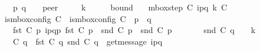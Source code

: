 \begin{isabellebody}
\ \ \ \ \ p\ q\ \ \ {\isacharcolon}{\kern0pt}{\isacharcolon}{\kern0pt}\ {\isachardoublequoteopen}{\isacharprime}{\kern0pt}peer{\isachardoublequoteclose}\isanewline
\ \ \ \ \ k\ \ \ \ \ {\isacharcolon}{\kern0pt}{\isacharcolon}{\kern0pt}\ {\isachardoublequoteopen}bound{\isachardoublequoteclose}\isanewline
\ \ \ {\isachardoublequoteopen}mbox{\isacharunderscore}{\kern0pt}step\ C{}\ {\isacharparenleft}{\kern0pt}{\isacharbang}{\kern0pt}{\isasymlangle}{\isacharparenleft}{\kern0pt}i\isactrlbsup p{\isasymrightarrow}q\isactrlesup {\isacharparenright}{\kern0pt}{\isasymrangle}{\isacharparenright}{\kern0pt}\ k\ C{}{\isachardoublequoteclose}\isanewline
\ \ \ {\isachardoublequoteopen}is{\isacharunderscore}{\kern0pt}mbox{\isacharunderscore}{\kern0pt}config\ C{}{\isachardoublequoteclose}\ \ {\isachardoublequoteopen}is{\isacharunderscore}{\kern0pt}mbox{\isacharunderscore}{\kern0pt}config\ C{}{\isachardoublequoteclose}\ \ {\isachardoublequoteopen}p\ {\isasymnoteq}\ q{\isachardoublequoteclose}\isanewline
\ \ \ \ \ {\isachardoublequoteopen}fst\ {\isacharparenleft}{\kern0pt}C{}\ p{\isacharparenright}{\kern0pt}\ {\isasymmidarrow}{\isacharparenleft}{\kern0pt}{\isacharbang}{\kern0pt}{\isasymlangle}{\isacharparenleft}{\kern0pt}i\isactrlbsup p{\isasymrightarrow}q\isactrlesup {\isacharparenright}{\kern0pt}{\isasymrangle}{\isacharparenright}{\kern0pt}{\isasymrightarrow}p\ {\isacharparenleft}{\kern0pt}fst\ {\isacharparenleft}{\kern0pt}C{}\ p{\isacharparenright}{\kern0pt}{\isacharparenright}{\kern0pt}{\isachardoublequoteclose}\ \ {\isachardoublequoteopen}snd\ {\isacharparenleft}{\kern0pt}C{}\ p{\isacharparenright}{\kern0pt}\ {\isacharequal}{\kern0pt}\ snd\ {\isacharparenleft}{\kern0pt}C{}\ p{\isacharparenright}{\kern0pt}{\isachardoublequoteclose}\isanewline
\ \ \ \ \ {\isachardoublequoteopen}{\isacharparenleft}{\kern0pt}\ {\isacharbar}{\kern0pt}\ {\isacharparenleft}{\kern0pt}snd\ {\isacharparenleft}{\kern0pt}C{}\ q{\isacharparenright}{\kern0pt}{\isacharparenright}{\kern0pt}\ {\isacharbar}{\kern0pt}\ {\isacharparenright}{\kern0pt}\ {\isacharless}{\kern0pt}\isactrlsub {\isasymB}\ k{\isachardoublequoteclose}\isanewline
\ \ \ \ \ {\isachardoublequoteopen}C{}\ q\ {\isacharequal}{\kern0pt}\ {\isacharparenleft}{\kern0pt}fst\ {\isacharparenleft}{\kern0pt}C{}\ q{\isacharparenright}{\kern0pt}{\isacharcomma}{\kern0pt}\ {\isacharparenleft}{\kern0pt}snd\ {\isacharparenleft}{\kern0pt}C{}\ q{\isacharparenright}{\kern0pt}{\isacharparenright}{\kern0pt}\ {\isasymcdot}\ {\isacharbrackleft}{\kern0pt}get{\isacharunderscore}{\kern0pt}message\ {\isacharparenleft}{\kern0pt}{\isacharbang}{\kern0pt}{\isasymlangle}{\isacharparenleft}{\kern0pt}i\isactrlbsup p{\isasymrightarrow}q\isactrlesup {\isacharparenright}{\kern0pt}{\isasymrangle}{\isacharparenright}{\kern0pt}{\isacharbrackright}{\kern0pt}{\isacharparenright}{\kern0pt}{\isachardoublequoteclose}\isanewline

\end{isabellebody}
